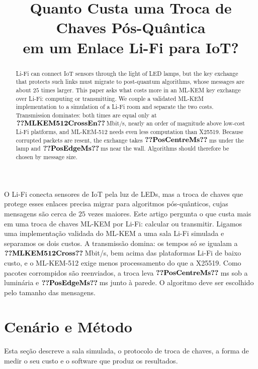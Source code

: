 \documentclass[12pt]{article}
\title{Quanto Custa uma Troca de Chaves Pós-Quântica\\
em um Enlace Li-Fi para IoT?}
\author{\autores}
\begin{document}
\maketitle

\begin{abstract}%
Li-Fi can connect IoT sensors through the light of LED lamps, but the key
exchange that protects such links must migrate to post-quantum algorithms,
whose messages are about $25$ times larger. This paper asks what costs more in
an ML-KEM key exchange over Li-Fi: computing or transmitting. We couple a
validated ML-KEM implementation to a simulation of a Li-Fi room and separate
the two costs. Transmission dominates: both times are equal only at
$\val{MLKEM512CrossEn}$\,Mbit/s, nearly an order of magnitude above low-cost
Li-Fi platforms, and ML-KEM-512 needs even less computation than X25519.
Because corrupted packets are resent, the exchange takes $\val{PosCentreMs}$\,ms
under the lamp and $\val{PosEdgeMs}$\,ms near the wall. Algorithms should
therefore be chosen by message size.
\end{abstract}

\begin{resumo}
O Li-Fi conecta sensores de IoT pela luz de LEDs, mas a troca de
chaves que protege esses enlaces precisa migrar para algoritmos pós-quânticos,
cujas mensagens são cerca de $25$ vezes maiores. Este artigo pergunta o que
custa mais em uma troca de chaves ML-KEM por Li-Fi: calcular ou transmitir.
Ligamos uma implementação validada do ML-KEM a uma sala Li-Fi simulada e
separamos os dois custos. A transmissão domina: os tempos só se igualam
a $\val{MLKEM512Cross}$\,Mbit/s, bem acima das plataformas Li-Fi de baixo custo, e o
ML-KEM-512 exige menos processamento do que a X25519. Como pacotes corrompidos são reenviados, a troca leva
$\val{PosCentreMs}$\,ms sob a luminária e $\val{PosEdgeMs}$\,ms junto à parede.
O algoritmo deve ser escolhido pelo tamanho das mensagens.
\end{resumo}






\section{Cenário e Método}\label{sec:model}
Esta seção descreve a sala simulada, o protocolo de troca de chaves, a forma de
medir o seu custo e o software que produz os resultados.
\end{document}
